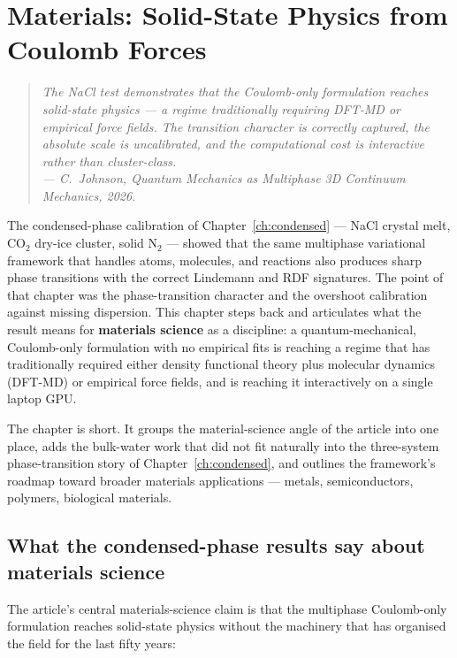 \chapter{Materials: Solid-State Physics from Coulomb Forces}\label{ch:materials}

\begin{quote}
\itshape The NaCl test demonstrates that the Coulomb-only formulation reaches solid-state physics --- a regime traditionally requiring DFT-MD or empirical force fields. The transition character is correctly captured, the absolute scale is uncalibrated, and the computational cost is interactive rather than cluster-class.\\
\normalfont\hfill --- C.~Johnson, \emph{Quantum Mechanics as Multiphase 3D Continuum Mechanics}, 2026.
\end{quote}
\bigskip

The condensed-phase calibration of Chapter~\ref{ch:condensed} --- NaCl crystal melt, CO$_2$ dry-ice cluster, solid N$_2$ --- showed that the same multiphase variational framework that handles atoms, molecules, and reactions also produces sharp phase transitions with the correct Lindemann and RDF signatures. The point of that chapter was the phase-transition character and the overshoot calibration against missing dispersion. This chapter steps back and articulates what the result means for \textbf{materials science} as a discipline: a quantum-mechanical, Coulomb-only formulation with no empirical fits is reaching a regime that has traditionally required either density functional theory plus molecular dynamics (DFT-MD) or empirical force fields, and is reaching it interactively on a single laptop GPU.

The chapter is short. It groups the material-science angle of the article into one place, adds the bulk-water work that did not fit naturally into the three-system phase-transition story of Chapter~\ref{ch:condensed}, and outlines the framework's roadmap toward broader materials applications --- metals, semiconductors, polymers, biological materials.

\section{What the condensed-phase results say about materials science}\label{sec:material-claim}

The article's central materials-science claim is that the multiphase Coulomb-only formulation reaches solid-state physics without the machinery that has organised the field for the last fifty years:

